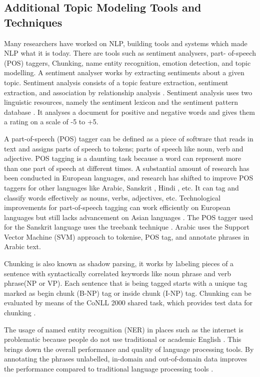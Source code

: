 \subsection{Additional Topic Modeling Tools and Techniques}

Many researchers have worked on NLP, building tools and systems which made NLP what it is today. There are tools such as sentiment analysers, part- of-speech (POS) taggers, Chunking, name entity recognition, emotion detection, and topic modelling. A sentiment analyser works by extracting sentiments about a given topic. Sentiment analysis consists of a topic feature extraction, sentiment extraction, and association by relationship analysis \cite{yi2003sentiment}. Sentiment analysis uses two linguistic resources, namely the sentiment lexicon and the sentiment pattern database \cite{nasukawa2003sentiment}. It analyses a document for positive and negative words and gives them a rating on a scale of -5 to +5.

A part-of-speech (POS) tagger can be defined as a piece of software that reads in text and assigns parts of speech to tokens; parts of speech like noun, verb and adjective. POS tagging is a daunting task because a word can represent more than one part of speech at different times. A substantial amount of research has been conducted in European languages, and research has shifted to improve POS taggers for other languages like Arabic, Sanskrit \cite{tapaswi2012treebank}, Hindi \cite{ranjan2003part}, etc. It can tag and classify words effectively as nouns, verbs, adjectives, etc. Technological improvements for part-of-speech tagging can work efficiently on European languages but still lacks advancement on Asian languages \cite{hirschberg2015advances}. The POS tagger used for the Sanskrit language uses the treebank technique \cite{bengoetxea2010application}. Arabic uses the Support Vector Machine (SVM) \cite{diab2004automatic} approach to tokenise, POS tag, and annotate phrases in Arabic text.

Chunking is also known as shadow parsing, it works by labeling pieces of a sentence with syntactically correlated keywords like noun phrase and verb phrase(NP or VP). Each sentence that is being tagged starts with a unique tag marked as begin chunk (B-NP) tag or inside chunk (I-NP) tag. Chunking can be evaluated by means of the CoNLL 2000 shared task, which provides test data for chunking \cite{sang2000introduction}. 

The usage of named entity recognition (NER) in places such as the internet is problematic because people do not use traditional or academic English \cite{nadeau2007survey}. This brings down the overall performance and quality of language processing tools. By annotating the phrases unlabelled, in-domain and out-of-domain data improves the performance compared to traditional language processing tools \cite{katiyar-cardie-2018-nested}.

